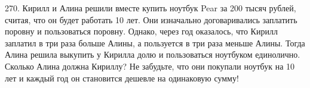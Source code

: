 270. Кирилл и Алина решили вместе купить ноутбук Pear за 200 тысяч рублей, считая, что он будет работать 10 лет. Они изначально договаривались заплатить поровну и пользоваться поровну. Однако, через год оказалось, что Кирилл заплатил в три раза больше Алины, а пользуется в три раза меньше Алины. Тогда Алина решила выкупить у Кирилла долю и пользоваться ноутбуком единолично. Сколько Алина должна Кириллу? Не забудьте, что они покупали ноутбук на 10 лет и каждый год он становится дешевле на одинаковую сумму!\\
